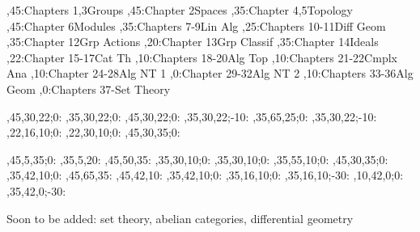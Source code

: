 
\setcounter{diagheight}{50}
\begin{chart}
,45:{Chapters 1,3}{Groups}{}
,45:{Chapter 2}{Spaces}{}
,35:{Chapter 4,5}{Topology}{}
,45:{Chapter 6}{Modules}{}
,35:{Chapters 7-9}{Lin Alg}{}
,25:{Chapters 10-11}{Diff Geom}{}
,35:{Chapter 12}{Grp Actions}{}
,20:{Chapter 13}{Grp Classif}{}
,35:{Chapter 14}{Ideals}{}
,22:{Chapter 15-17}{Cat Th}{}
,10:{Chapters 18-20}{Alg Top}{}
,10:{Chapters 21-22}{Cmplx Ana}{}
,10:{Chapter 24-28}{Alg NT 1}{}
,0:{Chapter 29-32}{Alg NT 2}{}
,10:{Chapters 33-36}{Alg Geom}{}
,0:{Chapters 37-}{Set Theory}{}

,45,30,22;0:   %
,35,30,22;0:   %
,45,30,22;0:   %
,35,30,22;-10: %
,35,65,25;0:   %
,35,30,22;-10: %
,22,16,10;0:   %
,22,30,10;0:   %
,45,30,35;0:   %

,45,5,35;0:    %
,35,5,20:      %
,45,50,35:     %
,35,30,10;0:   %
,35,30,10;0:   %
,35,55,10;0:   %
,45,30,35;0:   %
,35,42,10;0:   %
,45,65,35:     %
,45,42,10:     %
,35,42,10;0:   %
,35,16,10;0:   %
,35,16,10;-30: %
,10,42,0;0:    %
,35,42,0;-30:  %
\end{chart}

Soon to be added: set theory, abelian categories, differential geometry
